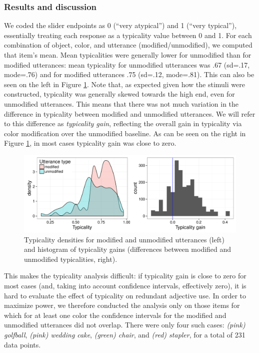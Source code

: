 \documentclass[11pt]{article}
\newcommand{\figref}[1]{Figure \ref{#1}}
\begin{document}
\subsubsection{Results and discussion}

We coded the slider endpoints as 0 (``very atypical'') and 1 (``very typical''), essentially treating each response as a typicality value between 0 and 1. For each combination of object, color, and utterance (modified/unmodified), we computed that item's mean. Mean typicalities were generally lower for unmodified than for modified utterances: mean typicality for unmodified utterances was .67 (sd=.17, mode=.76) and for modified utterances .75 (sd=.12, mode=.81). This can also be seen on the left in \figref{fig:typicalitydists}. Note that, as expected given how the stimuli were constructed, typicality was generally skewed towards the high end, even for unmodified utterances. This means that there was not much variation in  the difference in typicality between modified and unmodified utterances. We will refer to this difference as \emph{typicality gain}, reflecting the overall gain in typicality via color modification over the unmodified baseline. As can be seen on the right in \figref{fig:typicalitydists}, in most cases typicality gain was close to zero.

\begin{figure}
\centering
\includegraphics[width=.9\textwidth]{pics/typicality-dists}
\caption{Typicality densities for modified and unmodified utterances (left) and histogram of typicality gains (differences between modified and unmodified typicalities, right).}
\label{fig:typicalitydists}
\end{figure}

This makes the typicality analysis difficult: if typicality gain is close to zero for most cases (and, taking into account confidence intervals, effectively zero), it is hard to evaluate the effect of typicality on redundant adjective use. In order to maximize power, we therefore conducted the analysis only on those items for which for at least one color the confidence intervals for the modified and unmodified utterances did not overlap. There were only four such cases: \emph{(pink) golfball}, \emph{(pink) wedding cake}, \emph{(green) chair}, and \emph{(red) stapler}, for a total of 231 data points.
\end{document}

